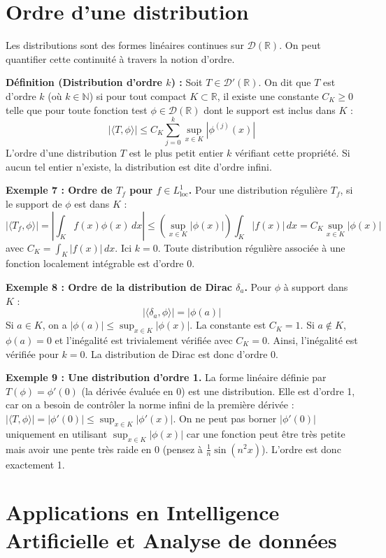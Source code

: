 \documentclass[11pt,a4paper]{article}
\begin{document}
\section{Ordre d'une distribution}

Les distributions sont des formes linéaires continues sur $\mathcal{D}(\mathbb{R})$. On peut quantifier cette continuité à travers la notion d'ordre.

\textbf{Définition (Distribution d'ordre $k$) :} Soit $T \in \mathcal{D}'(\mathbb{R})$. On dit que $T$ est d'ordre $k$ (où $k \in \mathbb{N}$) si pour tout compact $K \subset \mathbb{R}$, il existe une constante $C_K \ge 0$ telle que pour toute fonction test $\phi \in \mathcal{D}(\mathbb{R})$ dont le support est inclus dans $K$ :
$$ |\langle T, \phi \rangle| \le C_K \sum_{j=0}^k \sup_{x \in K} |\phi^{(j)}(x)| $$
L'ordre d'une distribution $T$ est le plus petit entier $k$ vérifiant cette propriété. Si aucun tel entier n'existe, la distribution est dite d'ordre infini.

\textbf{Exemple 7 : Ordre de $T_f$ pour $f \in L^1_{\text{loc}}$.}
Pour une distribution régulière $T_f$, si le support de $\phi$ est dans $K$ :
$$ |\langle T_f, \phi \rangle| = \left| \int_K f(x) \phi(x) \, dx \right| \le \left( \sup_{x \in K} |\phi(x)| \right) \int_K |f(x)| \, dx = C_K \sup_{x \in K} |\phi(x)| $$
avec $C_K = \int_K |f(x)| \, dx$.
Ici $k=0$. Toute distribution régulière associée à une fonction localement intégrable est d'ordre $0$.

\textbf{Exemple 8 : Ordre de la distribution de Dirac $\delta_a$.}
Pour $\phi$ à support dans $K$ :
$$ |\langle \delta_a, \phi \rangle| = |\phi(a)| $$
Si $a \in K$, on a $|\phi(a)| \le \sup_{x \in K} |\phi(x)|$. La constante est $C_K = 1$.
Si $a \notin K$, $\phi(a) = 0$ et l'inégalité est trivialement vérifiée avec $C_K = 0$.
Ainsi, l'inégalité est vérifiée pour $k=0$. La distribution de Dirac est donc d'ordre $0$.

\textbf{Exemple 9 : Une distribution d'ordre 1.}
La forme linéaire définie par $T(\phi) = \phi'(0)$ (la dérivée évaluée en 0) est une distribution.
Elle est d'ordre 1, car on a besoin de contrôler la norme infini de la première dérivée : $|\langle T, \phi \rangle| = |\phi'(0)| \le \sup_{x \in K} |\phi'(x)|$.
On ne peut pas borner $|\phi'(0)|$ uniquement en utilisant $\sup_{x \in K} |\phi(x)|$ car une fonction peut être très petite mais avoir une pente très raide en 0 (pensez à $\frac{1}{n}\sin(n^2 x)$). L'ordre est donc exactement 1.

\section{Applications en Intelligence Artificielle et Analyse de données}
\end{document}
